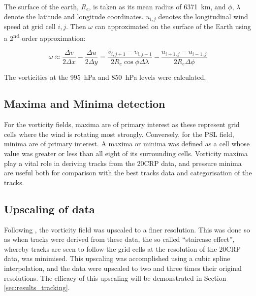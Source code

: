 \documentclass[pdftex,12pt,a4paper]{report}
\newcommand{\ts}{\textsuperscript}
\begin{document}
The surface of the earth, $R_e$, is taken as its mean radius of \SI{6371}{km}, and $\phi$, $\lambda$ denote the latitude and longitude coordinates. $u_{i, j}$ denotes the longitudinal wind speed at grid cell $i, j$. Then $\omega$ can approximated on the surface of the Earth using a 2\ts{nd} order approximation: %


\begin{equation}
    \omega \approx \frac{\Delta v}{2 \Delta x} - \frac{\Delta u}{2 \Delta y} = \frac{v_{i,j+1} - v_{i,j-1}}{2 R_e \cos{\phi} \Delta \lambda} - \frac{u_{i+1,j} - u_{i-1,j}}{2 R_e \Delta \phi }
    \label{eqn:vorticity_2nd_order}
\end{equation}

The vorticities at the \SI{995}{hPa} and \SI{850}{hPa} levels were calculated.

\subsection{Maxima and Minima detection}
\label{sec:methods_maxima_minima}

For the vorticity fields, maxima are of primary interest as these represent grid cells where the wind is rotating most strongly. Conversely, for the PSL field, minima are of primary interest. A maxima or minima was defined as a cell whose value was greater or less than all eight of its surrounding cells. Vorticity maxima play a vital role in deriving tracks from the 20CRP data, and pressure minima are useful both for comparison with the best tracks data and categorisation of the tracks.

\subsection{Upscaling of data}

Following \textcite{TODOhodgesXXX}, the vorticity field was upscaled to a finer resolution. This was done so as when tracks were derived from these data, the so called ``staircase effect'', whereby tracks are seen to follow the grid cells at the resolution of the 20CRP data, was minimised. This upscaling was accomplished using a cubic spline interpolation, and the data were upscaled to two and three times their original resolutions. The efficacy of this upscaling will be demonstrated in Section \ref{sec:results_tracking}.
\end{document}
